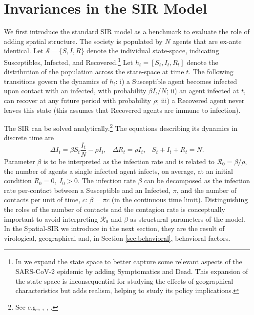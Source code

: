 \documentclass[english,11pt]{article}
\begin{document}
\section{Invariances in the SIR Model  \label{invariance} }

We first introduce the standard SIR model as a benchmark to evaluate the role of adding spatial structure. The society is populated by $N$ agents that are ex-ante identical. Let $\mathcal{S}=\{S, I, R\}$ denote the individual state-space, indicating Susceptibles, Infected, and Recovered.\footnote{In \cite{bisinmoro2020} we expand the state space to better capture some relevant aspects of the SARS-CoV-2 epidemic by adding Symptomatics and Dead. This expansion of the state space is inconsequential for studying the effects of geographical characteristics but adds realism, helping to study its policy implications.} 
Let $h_t=[S_t,I_t,R_t]$ denote the distribution of the population across the state-space at time $t$. 
The following transitions govern the dynamics of $h_t$: i) a Susceptible agent becomes infected
 upon contact with an infected, with probability $\beta {I_t}/{N}$; ii) an  agent infected at $t$, can recover at any future period with probability $\rho$; 
iii) a Recovered agent never leaves this state
(this assumes that Recovered agents are immune to infection). 

The SIR can be solved analytically.\footnote{See e.g., \cite{herben42hethcote}, \cite{Moll2020},  \cite{neumeyer2020clase}.} The equations describing its dynamics in discrete time are  
\begin{equation}
   \Delta  I_t = \beta S_t \frac{I_t}{N} - \rho I_t, \; \; \; \Delta R_t=\rho I_t, \; \; \; S_t+I_t+R_t=N.  \label{idot}
\end{equation} 
Parameter $\beta$ is to be interpreted as the infection rate and is related to $\mathcal{R}_0= \beta/\rho$, the number of agents a single infected agent infects, on average, at an initial condition $R_0=0, \; I_0 > 0$. The infection rate $\beta$ can be decomposed  as the infection rate per-contact between a Susceptible and an Infected, $\pi$, and the number of contacts per unit of time, $c$:   $\beta=\pi c$ (in the continuous time limit). Distinguishing
the roles of the number of contacts  and  the contagion rate is conceptually 
important to avoid interpreting  $\mathcal{R}_0$ and  $\beta$ as structural parameters of the model. In the Spatial-SIR we introduce in the next section, they are the result of virological,
geographical and, in Section \ref{sec:behavioral}, behavioral factors.
\end{document}
